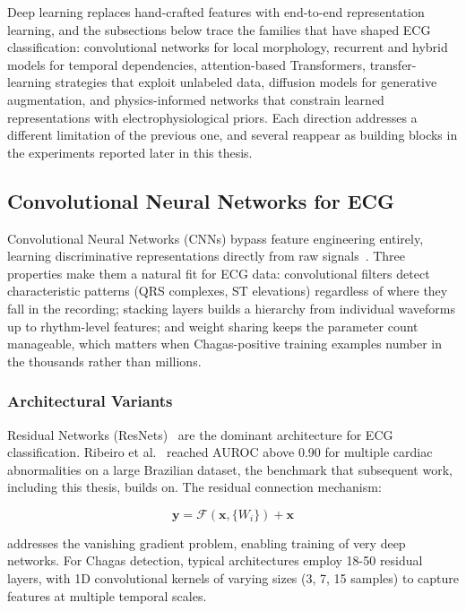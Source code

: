 Deep learning replaces hand-crafted features with end-to-end representation learning, and the subsections below trace the families that have shaped ECG classification: convolutional networks for local morphology, recurrent and hybrid models for temporal dependencies, attention-based Transformers, transfer-learning strategies that exploit unlabeled data, diffusion models for generative augmentation, and physics-informed networks that constrain learned representations with electrophysiological priors. Each direction addresses a different limitation of the previous one, and several reappear as building blocks in the experiments reported later in this thesis.

\subsection{Convolutional Neural Networks for ECG}

Convolutional Neural Networks (CNNs) bypass feature engineering entirely, learning discriminative representations directly from raw signals~\cite{he2016deep}. Three properties make them a natural fit for ECG data: convolutional filters detect characteristic patterns (QRS complexes, ST elevations) regardless of where they fall in the recording; stacking layers builds a hierarchy from individual waveforms up to rhythm-level features; and weight sharing keeps the parameter count manageable, which matters when Chagas-positive training examples number in the thousands rather than millions.

\subsubsection{Architectural Variants}

Residual Networks (ResNets)~\cite{he2016deep} are the dominant architecture for ECG classification. Ribeiro et al.~\cite{ribeiro2020automatic} reached AUROC above 0.90 for multiple cardiac abnormalities on a large Brazilian dataset, the benchmark that subsequent work, including this thesis, builds on. The residual connection mechanism:

\begin{equation}
\mathbf{y} = \mathcal{F}(\mathbf{x}, \{W_i\}) + \mathbf{x}
\end{equation}

addresses the vanishing gradient problem, enabling training of very deep networks. For Chagas detection, typical architectures employ 18-50 residual layers, with 1D convolutional kernels of varying sizes (3, 7, 15 samples) to capture features at multiple temporal scales.

